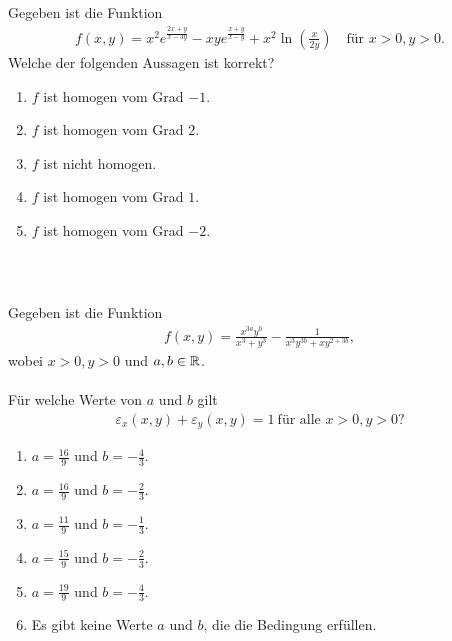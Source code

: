 \subsection*{}
Gegeben ist die Funktion
\begin{align*}
	f(x,y) 
	=
	x^2 e^{\frac{ 2x+y}{x - 3y }}
	-
	xy e^{\frac{x+y}{x-y}}
	+
	x^2 \ln \left( \frac{x }{2y} \right)
	\quad \textrm{für } x>0,y>0.
\end{align*}
Welche der folgenden Aussagen ist korrekt?
\renewcommand{\labelenumi}{(\alph{enumi})}
\begin{enumerate}
	\item
	$ f  $ ist homogen vom Grad $ -1 $.
	\item
	$ f  $ ist homogen vom Grad $ 2 $.
	\item
	$f $ ist nicht homogen.
	\item 
	$ f  $ ist homogen vom Grad $ 1$.
	\item
	$ f  $ ist homogen vom Grad $ -2 $.
\end{enumerate}
\ \\
\newpage
\subsection*{}
Gegeben ist die Funktion
\begin{align*}
	f(x,y)
	=
	\frac{x^{3a} y^b}{x^3 +y^3}
	- 
	\frac{1}{x^3 y^{3b} + x y^{2 + 3b}},
\end{align*}
wobei $ x > 0, y > 0 $ und $ a,b \in \mathbb{R} $.\\
\\
Für welche Werte von $ a $ und $ b $ gilt
\begin{align*}
	\varepsilon_x(x,y) + \varepsilon_y(x,y) = 1 \ \textrm{für alle } x>0, y>0\textrm{?}
\end{align*}
\renewcommand{\labelenumi}{(\alph{enumi})}
\begin{enumerate}
	\item 
	$a = \frac{16}{9}$ und $ b=-\frac{4}{3} $.
	\item
	$a = \frac{16}{9}$ und $ b=-\frac{2}{3} $.
	\item
	$a = \frac{11}{9}$ und $ b=-\frac{1}{3} $.
	\item
	$a = \frac{15}{9}$ und $ b=-\frac{2}{3} $.
	\item
	$a = \frac{19}{9}$ und $ b=-\frac{4}{3} $.
	\item
	Es gibt keine Werte $ a $ und $ b $, die die Bedingung erfüllen.
\end{enumerate}